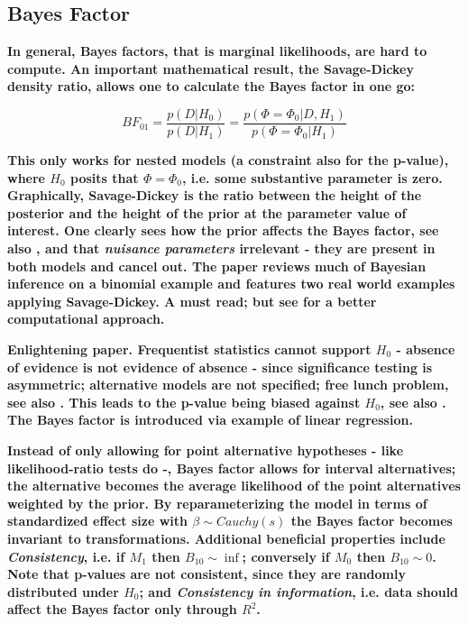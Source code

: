 \documentclass[12pt]{scrartcl}
\begin{document}
\subsection{Bayes Factor}
\begin{description}
  \item {}
  \item {}
  \item {}
  
  \textbf{In general, Bayes factors, that is marginal likelihoods, are hard to compute. An important mathematical result, the Savage-Dickey density ratio, allows one to calculate the Bayes factor in one go:}
  
  \begin{equation*}
    BF_{01} = \frac{p(D|H_0)}{p(D|H_1)} = \frac{p(\Phi = \Phi_0|D, H_1)}{p(\Phi = \Phi_0|H_1)}
  \end{equation*}
  
  \textbf{This only works for nested models (a constraint also for the p-value), where $H_0$ posits that $\Phi = \Phi_0$, i.e. some substantive parameter is zero. Graphically, Savage-Dickey is the ratio between the height of the posterior and the height of the prior at the parameter value of interest. One clearly sees how the prior affects the Bayes factor, see also \cite{liu2008bayes}, and that \emph{nuisance parameters} irrelevant - they are present in both models and cancel out. The paper reviews much of Bayesian inference on a binomial example and features two real world examples applying Savage-Dickey. A must read; but see \cite{morey2011using} for a better computational approach.}
  
  \item {}
  
  \textbf{Enlightening paper. Frequentist statistics cannot support $H_0$ - absence of evidence is not evidence of absence - since significance testing is asymmetric; alternative models are not specified; free lunch problem, see also \cite{rouder2015lunch}. This leads to the p-value being biased against $H_0$, see also \cite{wagenmakers2007practical, rouder2009bayesian}. The Bayes factor is introduced via example of linear regression.}
  
  \textbf{Instead of only allowing for point alternative hypotheses - like likelihood-ratio tests do -, Bayes factor allows for interval alternatives; the alternative becomes the average likelihood of the point alternatives weighted by the prior. By reparameterizing the model in terms of standardized effect size with $\beta \sim Cauchy(s)$ the Bayes factor becomes invariant to transformations. Additional beneficial properties include \emph{Consistency}, i.e. if $M_1$ then $B_{10} \sim \inf$; conversely if $M_0$ then $B_{10} \sim 0$. Note that p-values are not consistent, since they are randomly distributed under $H_0$; and \emph{Consistency in information}, i.e. data should affect the Bayes factor only through $R^2$.}
  

\end{description}
\end{document}
